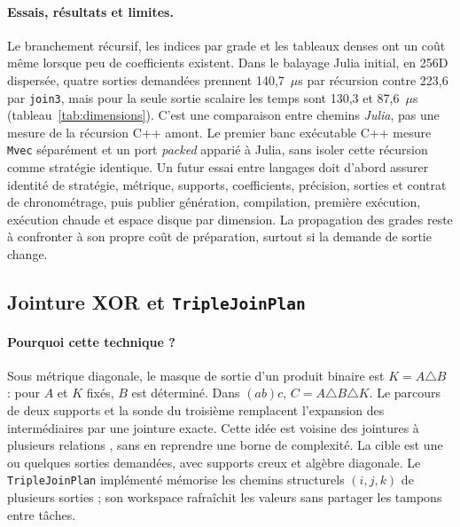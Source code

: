 \documentclass[11pt,a4paper]{article}
\newcommand{\code}[1]{\texttt{#1}}
\begin{document}
\paragraph{Essais, résultats et limites.}
Le branchement récursif, les indices par grade et les tableaux denses ont
un coût même lorsque peu de coefficients existent. Dans le balayage Julia
initial, en 256D dispersée, quatre sorties demandées prennent 140,7~\(\mu\)s
par récursion contre 223,6 par \code{join3}, mais pour la seule sortie
scalaire les temps sont 130,3 et 87,6~\(\mu\)s
(tableau~\ref{tab:dimensions}). C'est une comparaison entre chemins
\emph{Julia}, pas une mesure de la récursion C++ amont. Le premier banc
exécutable C++ mesure \code{Mvec} séparément et un port \emph{packed}
apparié à Julia, sans isoler cette récursion comme stratégie identique.
Un futur essai entre langages doit d'abord assurer identité de
stratégie, métrique, supports, coefficients, précision, sorties et contrat
de chronométrage, puis publier génération, compilation, première exécution,
exécution chaude et espace disque par dimension. La propagation des grades
reste à confronter à son propre coût de préparation, surtout si la demande
de sortie change.

\subsection{Jointure XOR et \code{TripleJoinPlan}}
\paragraph{Pourquoi cette technique ?}
Sous métrique diagonale, le masque de sortie d'un produit binaire est
$K=A\triangle B$ : pour $A$ et $K$ fixés, $B$ est déterminé. Dans
$(ab)c$, $C=A\triangle B\triangle K$. Le parcours de deux supports et la
sonde du troisième remplacent l'expansion des intermédiaires par une jointure
exacte. Cette idée est voisine des jointures à plusieurs relations
\cite{leapfrog}, sans en reprendre une borne de complexité. La cible est
une ou quelques sorties demandées, avec supports creux et algèbre diagonale.
Le \code{TripleJoinPlan} implémenté mémorise les chemins structurels
$(i,j,k)$ de plusieurs sorties ; son workspace rafraîchit les valeurs sans
partager les tampons entre tâches.
\end{document}
